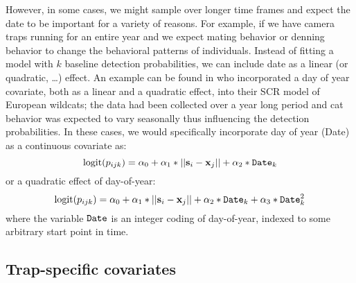 However, in some cases, we might sample over longer time frames and expect the date to be important for a
variety of reasons.  For example, if we have camera traps running for
an entire year and we expect mating behavior or denning behavior to
change the behavioral patterns of individuals. Instead of fitting a model with $k$ baseline detection probabilities, we can include date as a linear (or quadratic, \ldots) effect. An example can be found in 
\citet{kery_etal:2011} who incorporated a day of year covariate, both as a linear and a quadratic effect, into their
SCR model of European wildcats; the data had been collected over a year
long period and cat behavior was expected to vary seasonally thus
influencing the detection probabilities.  In these cases, we would
specifically incorporate day of year (Date) as a continuous covariate
as:
\[
\mbox{logit}(p_{ijk}) = \alpha_0 + \alpha_1*||{\bf s}_{i}-{\bf x}_{j}|| + \alpha_2*\mbox{\tt Date}_{k}
\]
or a quadratic effect of day-of-year:
\[
\mbox{logit}(p_{ijk}) = \alpha_0 + \alpha_1*||{\bf s}_{i}-{\bf x}_{j}|| +
\alpha_2*\mbox{\tt Date}_{k}
 + \alpha_3*\mbox{\tt Date}_{k}^{2}
\]
where the variable $\mbox{\tt Date}$ is an integer coding of
day-of-year, indexed to some arbitrary start point in time.

\subsection{Trap-specific covariates}

